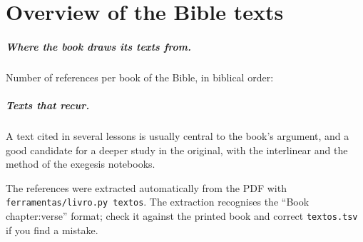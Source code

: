 \chapter{Overview of the Bible texts}

\paragraph{Where the book draws its texts from.} Number of references per book
of the Bible, in biblical order:

\begin{center}\small\begin{minipage}{.94\linewidth}\raggedright
\textosporlivro
\end{minipage}\end{center}

\paragraph{Texts that recur.} A text cited in several lessons is usually
central to the book's argument, and a good candidate for a deeper study in the
original, with the interlinear and the method of the exegesis notebooks.

\textosmaiscitados[2]

\begin{nota}
The references were extracted automatically from the PDF with
\texttt{ferramentas/livro.py textos}. The extraction recognises the
\enquote{Book chapter:verse} format; check it against the printed book and
correct \texttt{textos.tsv} if you find a mistake.
\end{nota}

